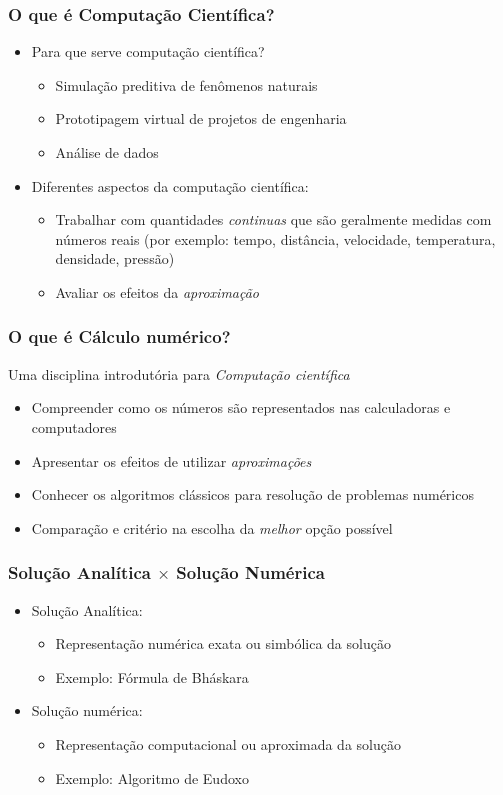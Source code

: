 \documentclass{beamer}
\begin{document}
\begin{frame}
	\frametitle{O que é Computação Científica?}
	\begin{itemize}
		\item Para que serve computação científica?
		\begin{itemize}
			\item Simulação preditiva de fenômenos naturais
			\item Prototipagem virtual de projetos de engenharia
			\item Análise de dados
		\end{itemize}
		\item Diferentes aspectos da computação científica:
		\begin{itemize}
			\item Trabalhar com quantidades \textit{continuas} que são geralmente medidas com números reais (por exemplo: tempo, distância, velocidade, temperatura, densidade, pressão)
			\item Avaliar os efeitos da \textit{aproximação} 
		\end{itemize}
	\end{itemize}			
\end{frame}

\begin{frame}
	\frametitle{O que é Cálculo numérico?}
	Uma disciplina introdutória para \textit{Computação científica}
	\begin{itemize}
		\item Compreender como os números são representados nas calculadoras e computadores
		\item Apresentar os efeitos de utilizar \textit{aproximações}
		\item Conhecer os algoritmos clássicos para resolução de problemas numéricos
		\item Comparação e critério na escolha da \textit{melhor} opção possível
	\end{itemize}	
\end{frame}

\begin{frame}
	\frametitle{Solução Analítica $\times$ Solução Numérica}
	\begin{itemize}
		\item Solução Analítica:
		\begin{itemize}
			\item Representação numérica exata ou simbólica da solução
			\item Exemplo: Fórmula de Bháskara
		\end{itemize}
		\item Solução numérica:
		\begin{itemize}
			\item Representação computacional ou aproximada da solução
			\item Exemplo: Algoritmo de Eudoxo
		\end{itemize}
	\end{itemize}	
\end{frame}
\end{document}
